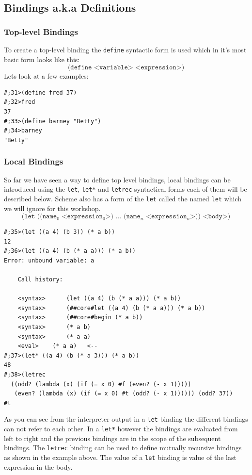 \documentclass[12pt,a4paper,english,twoside]{article}
\begin{document}
\subsection{Bindings a.k.a Definitions}
\subsubsection{Top-level Bindings}
To create a top-level binding the \texttt{define} syntactic form is used which 
in it's most basic form looks like this:
\begin{equation*}
\texttt{(define <variable> <expression>)}
\end{equation*}
Lets look at a few examples:
\begin{lstlisting}
#;31>(define fred 37)
#;32>fred
37
#;33>(define barney "Betty")
#;34>barney
"Betty"
\end{lstlisting}

\subsubsection{Local Bindings}
So far we have seen a way to define top level bindings, local bindings can be 
introduced using the \texttt{let}, \texttt{let*} and \texttt{letrec} 
syntactical forms each of them will be described below. Scheme also has a form
 of the \texttt{let} called the named \texttt{let} which we will ignore for 
 this workshop.
\begin{equation*}
\texttt{(let ((name$_{0}$ <expression$_{0}$>) $\dots$ (name$_{n}$ 
<expression$_{n}$>)) <body>)}
\end{equation*}
\begin{lstlisting}
#;35>(let ((a 4) (b 3)) (* a b))
12
#;36>(let ((a 4) (b (* a a))) (* a b)) 
Error: unbound variable: a

    Call history:

    <syntax>	  (let ((a 4) (b (* a a))) (* a b))
    <syntax>	  (##core#let ((a 4) (b (* a a))) (* a b))
    <syntax>	  (##core#begin (* a b))
    <syntax>	  (* a b)
    <syntax>	  (* a a)
    <eval>	  (* a a)	<--
#;37>(let* ((a 4) (b (* a 3))) (* a b))
48
#;38>(letrec
  ((odd? (lambda (x) (if (= x 0) #f (even? (- x 1)))))
   (even? (lambda (x) (if (= x 0) #t (odd? (- x 1)))))) (odd? 37))
#t
\end{lstlisting}
As you can see from the interpreter output in a \texttt{let} binding the 
different bindings can not refer to each other. In a \texttt{let*} however the 
bindings are evaluated from left to right and the previous bindings are in the 
scope of the subsequent bindings. The \texttt{letrec} binding can be used to 
define mutually recursive bindings as shown in the example above. The value of 
a \texttt{let} binding is value of the last expression in the body. 
\end{document}
